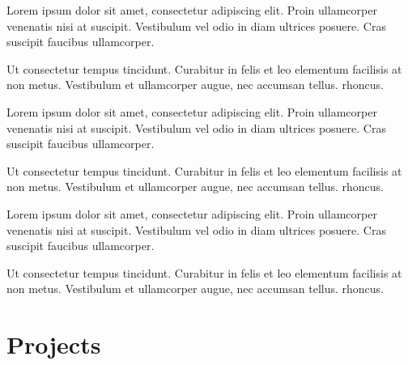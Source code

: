 \documentclass[]{plushcv}
\begin{document}
\begin{minipage}[t]{0.70\textwidth}
        \begin{tightemize}
            \sectionsep
            \item Lorem ipsum dolor sit amet, consectetur adipiscing elit. Proin ullamcorper venenatis nisi at suscipit. Vestibulum vel odio in diam ultrices posuere. Cras suscipit faucibus ullamcorper.
            \item Ut consectetur tempus tincidunt. Curabitur in felis et leo elementum facilisis at non metus. Vestibulum et ullamcorper augue, nec accumsan tellus.
            rhoncus.
        \end{tightemize}
        \sectionsep


        \begin{tightemize}
            \sectionsep
            \item Lorem ipsum dolor sit amet, consectetur adipiscing elit. Proin ullamcorper venenatis nisi at suscipit. Vestibulum vel odio in diam ultrices posuere. Cras suscipit faucibus ullamcorper.
            \item Ut consectetur tempus tincidunt. Curabitur in felis et leo elementum facilisis at non metus. Vestibulum et ullamcorper augue, nec accumsan tellus.
            rhoncus.
        \end{tightemize}
        \sectionsep


        \begin{tightemize}
            \sectionsep
            \item Lorem ipsum dolor sit amet, consectetur adipiscing elit. Proin ullamcorper venenatis nisi at suscipit. Vestibulum vel odio in diam ultrices posuere. Cras suscipit faucibus ullamcorper.
            \item Ut consectetur tempus tincidunt. Curabitur in felis et leo elementum facilisis at non metus. Vestibulum et ullamcorper augue, nec accumsan tellus.
            rhoncus.
        \end{tightemize}
        \sectionsep




        \section{Projects}


\end{minipage}
\end{document}
